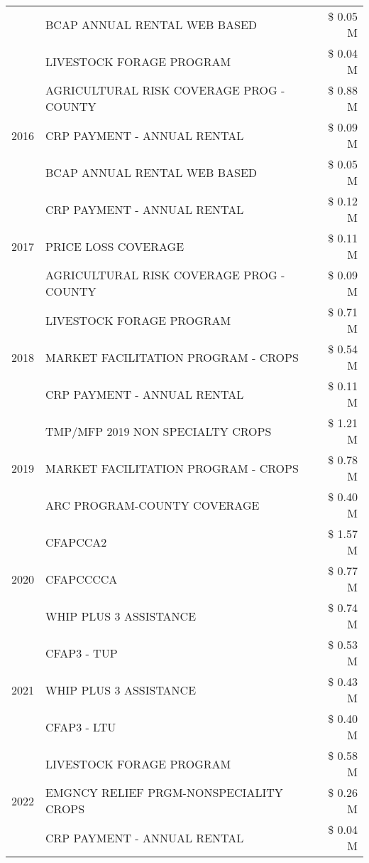 \begin{tabular}{llr}
 & BCAP ANNUAL RENTAL WEB BASED & \$ 0.05 M \\
 & LIVESTOCK FORAGE PROGRAM & \$ 0.04 M \\
\cline{1-3}
\multirow[t]{3}{*}{2016} & AGRICULTURAL RISK COVERAGE PROG - COUNTY & \$ 0.88 M \\
 & CRP PAYMENT - ANNUAL RENTAL & \$ 0.09 M \\
 & BCAP ANNUAL RENTAL WEB BASED & \$ 0.05 M \\
\cline{1-3}
\multirow[t]{3}{*}{2017} & CRP PAYMENT - ANNUAL RENTAL & \$ 0.12 M \\
 & PRICE LOSS COVERAGE & \$ 0.11 M \\
 & AGRICULTURAL RISK COVERAGE PROG - COUNTY & \$ 0.09 M \\
\cline{1-3}
\multirow[t]{3}{*}{2018} & LIVESTOCK FORAGE PROGRAM & \$ 0.71 M \\
 & MARKET FACILITATION PROGRAM - CROPS & \$ 0.54 M \\
 & CRP PAYMENT - ANNUAL RENTAL & \$ 0.11 M \\
\cline{1-3}
\multirow[t]{3}{*}{2019} & TMP/MFP 2019 NON SPECIALTY CROPS & \$ 1.21 M \\
 & MARKET FACILITATION PROGRAM - CROPS & \$ 0.78 M \\
 & ARC PROGRAM-COUNTY COVERAGE & \$ 0.40 M \\
\cline{1-3}
\multirow[t]{3}{*}{2020} & CFAPCCA2 & \$ 1.57 M \\
 & CFAPCCCCA & \$ 0.77 M \\
 & WHIP PLUS 3 ASSISTANCE & \$ 0.74 M \\
\cline{1-3}
\multirow[t]{3}{*}{2021} & CFAP3 - TUP & \$ 0.53 M \\
 & WHIP PLUS 3 ASSISTANCE & \$ 0.43 M \\
 & CFAP3 - LTU & \$ 0.40 M \\
\cline{1-3}
\multirow[t]{3}{*}{2022} & LIVESTOCK FORAGE PROGRAM & \$ 0.58 M \\
 & EMGNCY RELIEF PRGM-NONSPECIALITY CROPS & \$ 0.26 M \\
 & CRP PAYMENT - ANNUAL RENTAL & \$ 0.04 M \\
\cline{1-3}
\bottomrule
\end{tabular}
